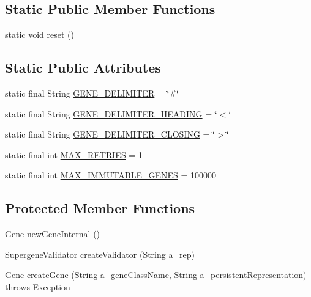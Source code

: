 \subsection*{Static Public Member Functions}
\begin{DoxyCompactItemize}
\item 
static void \hyperlink{classorg_1_1jgap_1_1supergenes_1_1_abstract_supergene_afdcc065673680fb080e17ff2596a0eb0}{reset} ()
\end{DoxyCompactItemize}
\subsection*{Static Public Attributes}
\begin{DoxyCompactItemize}
\item 
static final String \hyperlink{classorg_1_1jgap_1_1supergenes_1_1_abstract_supergene_ae7be27a291a2aa7e594384dd7a5936a8}{G\-E\-N\-E\-\_\-\-D\-E\-L\-I\-M\-I\-T\-E\-R} = \char`\"{}\#\char`\"{}
\item 
static final String \hyperlink{classorg_1_1jgap_1_1supergenes_1_1_abstract_supergene_aebbbd0fdd22a6d94c951471c8ae86b84}{G\-E\-N\-E\-\_\-\-D\-E\-L\-I\-M\-I\-T\-E\-R\-\_\-\-H\-E\-A\-D\-I\-N\-G} = \char`\"{}$<$\char`\"{}
\item 
static final String \hyperlink{classorg_1_1jgap_1_1supergenes_1_1_abstract_supergene_a96059d4ef9cca18130330f3ab782c28b}{G\-E\-N\-E\-\_\-\-D\-E\-L\-I\-M\-I\-T\-E\-R\-\_\-\-C\-L\-O\-S\-I\-N\-G} = \char`\"{}$>$\char`\"{}
\item 
static final int \hyperlink{classorg_1_1jgap_1_1supergenes_1_1_abstract_supergene_a6839c4b04a89a58c967219eda28a5dbb}{M\-A\-X\-\_\-\-R\-E\-T\-R\-I\-E\-S} = 1
\item 
static final int \hyperlink{classorg_1_1jgap_1_1supergenes_1_1_abstract_supergene_a40054ab751c7676fcd9f974c029a6a9d}{M\-A\-X\-\_\-\-I\-M\-M\-U\-T\-A\-B\-L\-E\-\_\-\-G\-E\-N\-E\-S} = 100000
\end{DoxyCompactItemize}
\subsection*{Protected Member Functions}
\begin{DoxyCompactItemize}
\item 
\hyperlink{interfaceorg_1_1jgap_1_1_gene}{Gene} \hyperlink{classorg_1_1jgap_1_1supergenes_1_1_abstract_supergene_a1e30b794dee0e8da4d5a4d213e9fb2c1}{new\-Gene\-Internal} ()
\item 
\hyperlink{interfaceorg_1_1jgap_1_1supergenes_1_1_supergene_validator}{Supergene\-Validator} \hyperlink{classorg_1_1jgap_1_1supergenes_1_1_abstract_supergene_a497a53be8d8d711ed48c62b062984a94}{create\-Validator} (String a\-\_\-rep)
\item 
\hyperlink{interfaceorg_1_1jgap_1_1_gene}{Gene} \hyperlink{classorg_1_1jgap_1_1supergenes_1_1_abstract_supergene_a32c5375e3de833953678146fb3dcb5b3}{create\-Gene} (String a\-\_\-gene\-Class\-Name, String a\-\_\-persistent\-Representation)  throws Exception 
\end{DoxyCompactItemize}
